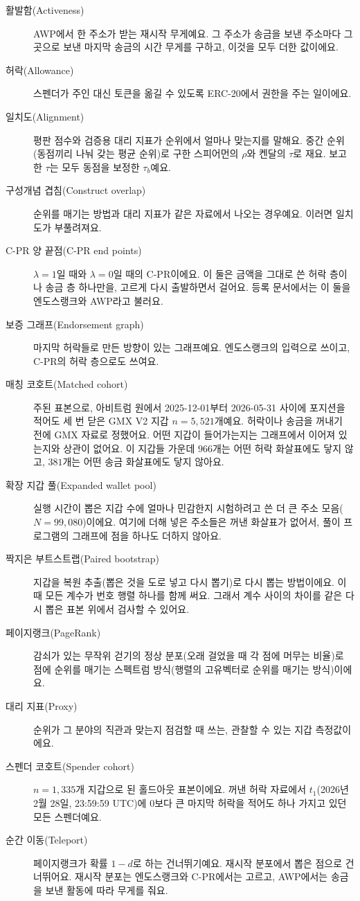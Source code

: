 \begin{description}
\item[활발함(Activeness)] AWP에서 한 주소가 받는 재시작 무게예요. 그 주소가 송금을 보낸 주소마다 그곳으로 보낸 마지막 송금의 시간 무게를 구하고, 이것을 모두 더한 값이에요.
\item[허락(Allowance)] 스펜더가 주인 대신 토큰을 옮길 수 있도록 ERC-20에서 권한을 주는 일이에요.
\item[일치도(Alignment)] 평판 점수와 검증용 대리 지표가 순위에서 얼마나 맞는지를 말해요. 중간 순위(동점끼리 나눠 갖는 평균 순위)로 구한 스피어먼의 $\rho$와 켄달의 $\tau$로 재요. 보고한 $\tau$는 모두 동점을 보정한 $\tau_b$예요.
\item[구성개념 겹침(Construct overlap)] 순위를 매기는 방법과 대리 지표가 같은 자료에서 나오는 경우예요. 이러면 일치도가 부풀려져요.
\item[C-PR 양 끝점(C-PR end points)] $\lambda=1$일 때와 $\lambda=0$일 때의 C-PR이에요. 이 둘은 금액을 그대로 쓴 허락 층이나 송금 층 하나만을, 고르게 다시 출발하면서 걸어요. 등록 문서에서는 이 둘을 엔도스랭크와 AWP라고 불러요.
\item[보증 그래프(Endorsement graph)] 마지막 허락들로 만든 방향이 있는 그래프예요. 엔도스랭크의 입력으로 쓰이고, C-PR의 허락 층으로도 쓰여요.
\item[매칭 코호트(Matched cohort)] 주된 표본으로, 아비트럼 원에서 2025-12-01부터 2026-05-31 사이에 포지션을 적어도 세 번 닫은 GMX V2 지갑 $n=5{,}521$개예요. 허락이나 송금을 꺼내기 전에 GMX 자료로 정했어요. 어떤 지갑이 들어가는지는 그래프에서 이어져 있는지와 상관이 없어요. 이 지갑들 가운데 $966$개는 어떤 허락 화살표에도 닿지 않고, $381$개는 어떤 송금 화살표에도 닿지 않아요.
\item[확장 지갑 풀(Expanded wallet pool)] 실행 시간이 뽑은 지갑 수에 얼마나 민감한지 시험하려고 쓴 더 큰 주소 모음($N=99{,}080$)이에요. 여기에 더해 넣은 주소들은 꺼낸 화살표가 없어서, 풀이 프로그램의 그래프에 점을 하나도 더하지 않아요.
\item[짝지은 부트스트랩(Paired bootstrap)] 지갑을 복원 추출(뽑은 것을 도로 넣고 다시 뽑기)로 다시 뽑는 방법이에요. 이때 모든 계수가 번호 행렬 하나를 함께 써요. 그래서 계수 사이의 차이를 같은 다시 뽑은 표본 위에서 검사할 수 있어요.
\item[페이지랭크(PageRank)] 감쇠가 있는 무작위 걷기의 정상 분포(오래 걸었을 때 각 점에 머무는 비율)로 점에 순위를 매기는 스펙트럼 방식(행렬의 고유벡터로 순위를 매기는 방식)이에요.
\item[대리 지표(Proxy)] 순위가 그 분야의 직관과 맞는지 점검할 때 쓰는, 관찰할 수 있는 지갑 측정값이에요.
\item[스펜더 코호트(Spender cohort)] $n=1{,}335$개 지갑으로 된 홀드아웃 표본이에요. 꺼낸 허락 자료에서 $t_1$(2026년 2월 28일, 23:59:59 UTC)에 0보다 큰 마지막 허락을 적어도 하나 가지고 있던 모든 스펜더예요.
\item[순간 이동(Teleport)] 페이지랭크가 확률 $1-d$로 하는 건너뛰기예요. 재시작 분포에서 뽑은 점으로 건너뛰어요. 재시작 분포는 엔도스랭크와 C-PR에서는 고르고, AWP에서는 송금을 보낸 활동에 따라 무게를 줘요.
\end{description}







